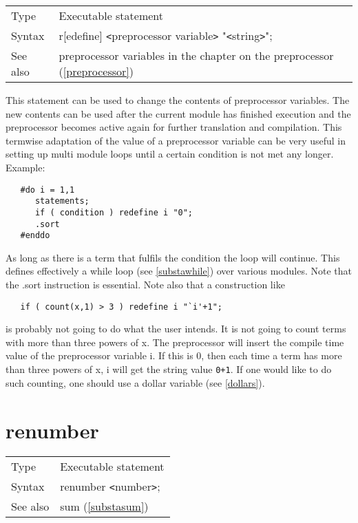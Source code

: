 \noindent \begin{tabular}{ll}
Type & Executable statement\\
Syntax & r[edefine] {\tt<}preprocessor variable{\tt>} "{\tt<}string{\tt>}";
\\ See also & preprocessor variables in the chapter on the preprocessor 
    (\ref{preprocessor})
\end{tabular} \vspace{4mm}

\noindent This statement can be used to change the contents 
of preprocessor 
variables. The new contents can be used after 
the current module has finished execution and the preprocessor becomes 
active again for further translation and compilation. 
This termwise adaptation of the value of a preprocessor variable can be 
very useful in setting up multi module loops until a certain condition is 
not met any longer. Example:
\begin{verbatim}
   #do i = 1,1
      statements;
      if ( condition ) redefine i "0";
      .sort
   #enddo
\end{verbatim}
As long as there is a term that fulfils the condition the loop 
will continue. This defines effectively a while loop (see 
\ref{substawhile}) over various modules. Note that the .sort 
instruction is essential. Note also that a construction like
\begin{verbatim}
   if ( count(x,1) > 3 ) redefine i "`i'+1";
\end{verbatim}
is probably not going to do what the user intends. It is not going to count 
terms with more than three powers of x. The preprocessor will insert the 
compile time value of the preprocessor variable i. If this is 0, then each 
time a term has more than three powers of x, i will get the string value 
\verb:0+1:. If one would like to do such counting, one should use a 
dollar variable (see \ref{dollars}). \vspace{10mm}


\section{renumber}
\label{substarenumber}

\noindent \begin{tabular}{ll}
Type & Executable statement\\
Syntax & renumber {\tt<}number{\tt>};
\\ See also & sum (\ref{substasum})
\end{tabular}\vspace{4mm}


